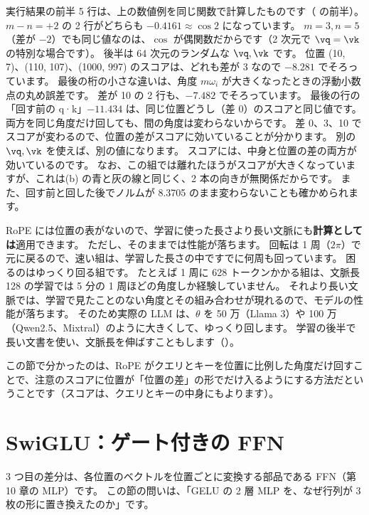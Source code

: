 実行結果の前半 5 行は、上の数値例を同じ関数で計算したものです（ の前半）。
$m-n=+2$ の 2 行がどちらも $-0.4161\approx\cos2$ になっています。
$m=3,n=5$（差が $-2$）でも同じ値なのは、$\cos$ が偶関数だからです（2 次元で $\vq=\vk$ の特別な場合です）。
後半は 64 次元のランダムな $\vq,\vk$ です。
位置 (10, 7)、(110, 107)、(1000, 997) のスコアは、どれも差が 3 なので $-8.281$ でそろっています。
最後の桁の小さな違いは、角度 $m\omega_i$ が大きくなったときの浮動小数点の丸め誤差です。
差が 10 の 2 行も、$-7.482$ でそろっています。
最後の行の「回す前の q·k」$-11.434$ は、同じ位置どうし（差 0）のスコアと同じ値です。
両方を同じ角度だけ回しても、間の角度は変わらないからです。
差 0、3、10 でスコアが変わるので、位置の差がスコアに効いていることが分かります。
別の $\vq,\vk$ を使えば、別の値になります。
スコアには、中身と位置の差の両方が効いているのです。
なお、この組では離れたほうがスコアが大きくなっていますが、これは(b) の青と灰の線と同じく、2 本の向きが無関係だからです。
また、回す前と回した後でノルムが 8.3705 のまま変わらないことも確かめられます。

RoPE には位置の表がないので、学習に使った長さより長い文脈にも\textbf{計算としては}適用できます。
ただし、そのままでは性能が落ちます。
回転は 1 周（$2\pi$）で元に戻るので、速い組は、学習した長さの中ですでに何周も回っています。
困るのはゆっくり回る組です。
たとえば 1 周に 628 トークンかかる組は、文脈長 128 の学習では 5 分の 1 周ほどの角度しか経験していません。
それより長い文脈では、学習で見たことのない角度とその組み合わせが現れるので、モデルの性能が落ちます。
そのため実際の LLM は、$\theta$ を 50 万（Llama 3）や 100 万（Qwen2.5、Mixtral）のように大きくして、ゆっくり回します。
学習の後半で長い文書を使い、文脈長を伸ばすこともします（）。

この節で分かったのは、RoPE がクエリとキーを位置に比例した角度だけ回すことで、注意のスコアに位置が「位置の差」の形でだけ入るようにする方法だということです（スコアは、クエリとキーの中身にもよります）。

\section{SwiGLU：ゲート付きの FFN}\label{sec:ma-swiglu}

3 つ目の差分は、各位置のベクトルを位置ごとに変換する部品である FFN（第 10 章の MLP）です。
この節の問いは、「GELU の 2 層 MLP を、なぜ行列が 3 枚の形に置き換えたのか」です。

